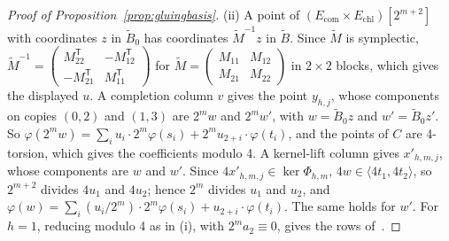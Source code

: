 \documentclass[version=preprint]{iacrcc}
\newcommand{\Ecom}{E_{\mathrm{com}}}
\newcommand{\Echl}{E_{\mathrm{chl}}}
\begin{document}
\begin{proof}[Proof of Proposition~\ref{prop:gluingbasis}]
        (ii) A point of $(\Ecom \times \Echl)[2^{m+2}]$ with coordinates $z$ in
        $\tilde B_0$ has coordinates $\tilde M^{-1} z$ in $\tilde B$. Since $\tilde
        M$ is symplectic, $\tilde M^{-1} = \left(\begin{smallmatrix} M_{22}^{\mathsf T} &
        -M_{12}^{\mathsf T} \\ -M_{21}^{\mathsf T} & M_{11}^{\mathsf T} \end{smallmatrix}\right)$
        for $\tilde M = \left(\begin{smallmatrix} M_{11} & M_{12} \\ M_{21} & M_{22}
        \end{smallmatrix}\right)$ in $2 \times 2$ blocks, which gives the displayed
        $u$. A completion column $v$ gives the point $y_{h,j}$, whose components on
        copies $(0, 2)$ and $(1, 3)$ are $2^m w$ and $2^m w'$, with $w = \tilde B_0
        z$ and $w' = \tilde B_0 z'$. So $\varphi(2^m w) = \sum_i u_i \cdot 2^m
        \varphi(s_i) + 2^m u_{2+i} \cdot \varphi(t_i)$, and the points of $C$ are
        4-torsion, which gives the coefficients modulo 4. A kernel-lift column
        gives $x'_{h,m,j}$, whose components are $w$ and $w'$. Since $4
        x'_{h,m,j} \in \ker \Phi_{h,m}$, $4w \in \langle 4 t_1, 4 t_2 \rangle$, so
        $2^{m+2}$ divides $4 u_1$ and $4 u_2$; hence $2^m$ divides $u_1$ and
        $u_2$, and $\varphi(w) = \sum_i (u_i / 2^m) \cdot 2^m \varphi(s_i) +
        u_{2+i} \cdot \varphi(t_i)$. The same holds for $w'$. For $h = 1$,
        reducing modulo 4 as in (i), with $2^m a_2 \equiv 0$, gives the rows
        of~\cite[Lemma 30]{Dar24}.
    \end{proof}
\end{document}
